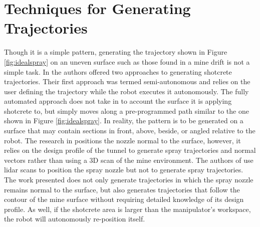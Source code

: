 \section{Techniques for Generating Trajectories}
Though it is a simple pattern, generating the trajectory shown in Figure \ref{fig:idealspray} on an uneven surface such as those found in a mine drift is not a simple task. In \cite{fully} the authors offered two approaches to generating shotcrete trajectories. Their first approach was termed semi-autonomous and relies on the user defining the trajectory while the robot executes it autonomously. The fully automated approach does not take in to account the surface it is applying shotcrete to, but simply moves along a pre-programmed path similar to the one shown in Figure \ref{fig:idealspray}. In reality, the pattern is to be generated on a surface that may contain sections in front, above, beside, or angled relative to the robot. The research in \cite{steal} positions the nozzle normal to the surface, however, it relies on the design profile of the tunnel to generate spray trajectories and normal vectors rather than using a 3D scan of the mine environment. The authors of \cite{artd} use \acrshort{lidar} scans to position the spray nozzle but not to generate spray trajectories. The work presented does not only generate trajectories in which the spray nozzle remains normal to the surface, but also generates trajectories that follow the contour of the mine surface without requiring detailed knowledge of its design profile. As well, if the shotcrete area is larger than the manipulator's workspace, the robot will autonomously re-position itself.\\

